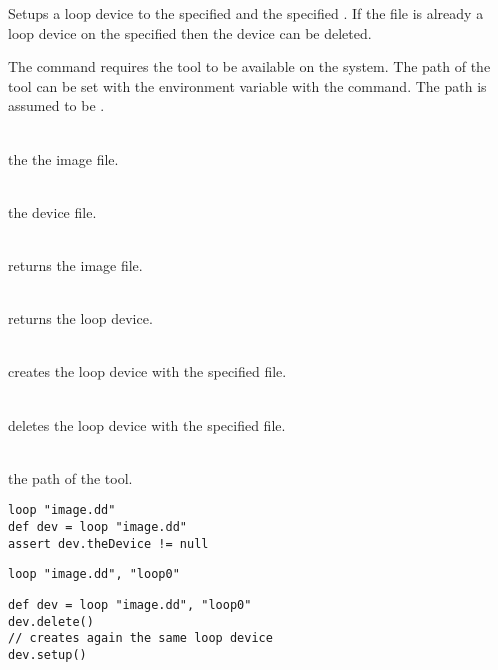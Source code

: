 %


Setups a loop device to the specified  and the specified . 
If the file is already a loop device on the specified  then 
the device can be deleted.

The command requires the tool \cite{losetup13} to be 
available on the system. The path of the tool can be set with the
environment variable  with the 
command. The path is assumed to be .

\begin{asparadesc}
%
\item[\code{file}] \hfill \\
the the image file.
%
\item[\code{device}] \hfill \\
the device file.
%
\item[\code{theFile}] \hfill \\
returns the image file.
%
\item[\code{theDevice}] \hfill \\
returns the loop device.
%
\item[\code{setup()}] \hfill \\
creates the loop device with the specified file.
%
\item[\code{delete()}] \hfill \\
deletes the loop device with the specified file.
%
\item[\code{LOSETUP\_COMMAND}] \hfill \\
the path of the  tool.
%
\end{asparadesc}

\begin{lstlisting}[style=Groovybash, label={lst:example_loop1}, title={
Setups the image file on the next available loop device.}]
loop "image.dd"
def dev = loop "image.dd"
assert dev.theDevice != null
\end{lstlisting}

\begin{lstlisting}[style=Groovybash, label={lst:example_loop2}, title={
Setups the image file on the specified loop device.}]
loop "image.dd", "loop0"
\end{lstlisting}

\begin{lstlisting}[style=Groovybash, label={lst:example_loop3}, title={
Deletes the loop device.}]
def dev = loop "image.dd", "loop0"
dev.delete()
// creates again the same loop device
dev.setup()
\end{lstlisting}

